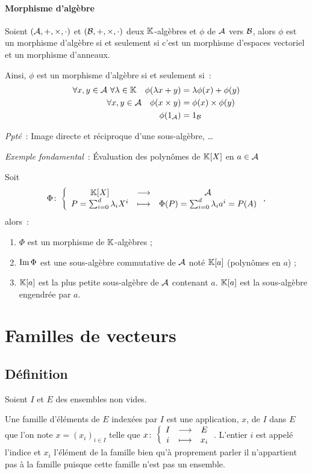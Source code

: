 \paragraph{Morphisme d'algèbre}
\begin{defdef}
	Soient  $(\mathcal{A},+,\times,\cdot)$ et $(\mathcal{B},+,\times,\cdot)$ deux $\mathbb{K}$-algèbres et $\phi$ de $\mathcal{A}$ vers $\mathcal{B}$, alors $\phi$ est un morphisme d'algèbre si et seulement si c'est un morphisme d'espaces vectoriel et un morphisme d'anneaux.
\end{defdef}
Ainsi, $\phi$ est un morphisme d'algèbre si et seulement si~:
\begin{align}
	\forall x,y \in \mathcal{A} \ \forall \lambda \in \mathbb{K} \quad \phi(\lambda x+y) &= \lambda\phi(x)+\phi(y) \\
	\forall x,y \in \mathcal{A} \quad \phi(x \times y) &= \phi(x) \times \phi(y) \\
	\phi(1_{\mathcal{A}}) &= 1_{\mathcal{B}}
\end{align}

\emph{Ppté}~: Image directe et réciproque d'une sous-algèbre, \ldots

\emph{Exemple fondamental}~: Évaluation des polynômes de $\mathbb{K}[X]$ en $a \in \mathcal{A}$
\begin{prop}
	Soit 
	\begin{equation}
		\Phi\colon \left\{\begin{array}{ccc} \mathbb{K}[X] & \longrightarrow &\mathcal{A}\\ P = \sum_{i=0}^d \lambda_i X^i & \longmapsto & \Phi(P) = \sum_{i=0}^d\lambda_i a^i=P(A) \end{array} \right.,
	\end{equation} 
	alors~:
	\begin{enumerate}
		\item $\Phi$ est un morphisme de $\mathbb{K}$-algèbres ;
		\item $\operatorname{Im}{\Phi}$ est une sous-algèbre commutative de $\mathcal{A}$ noté $\mathbb{K}[a]$ (polynômes en $a$) ;
		\item $\mathbb{K}[a]$ est la plus petite sous-algèbre de $\mathcal{A}$ contenant $a$. $\mathbb{K}[a]$ est la sous-algèbre engendrée par $a$.
	\end{enumerate}
\end{prop}

\section{Familles de vecteurs}
\subsection{Définition}
Soient $I$ et $E$ des ensembles non vides.

Une famille d'éléments de $E$ indexées par $I$ est une application, $x$, de $I$ dans $E$ que l'on note $x=(x_i)_{i \in I}$ telle que $x\colon \left\{\begin{array}{ccc} I & \longrightarrow &E\\ i & \longmapsto & x_i \end{array} \right.$. L'entier $i$  est appelé l'indice et $x_i$ l'élément de la famille bien qu'à proprement parler il n'appartient pas à la famille puisque cette famille n'est pas un ensemble.


